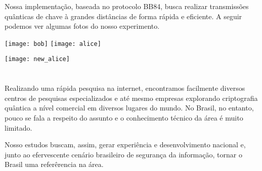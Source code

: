 \documentclass{sciposter}
\newcommand{\tituloA}[1]{\emph{\textbf{\color{white}{#1}}}}
\begin{document}
\begin{multicols*}{2}
{\vspace{0.5cm}
\par Nossa implementação, baseada no protocolo BB84, busca realizar transmissões quânticas de chave à grandes distâncias de forma rápida e eficiente. A seguir podemos ver algumas fotos do nosso experimento.

\vspace{1cm}
\hspace{1cm}
\texttt{[image: bob]}
\hspace{0.5cm}
\texttt{[image: alice]}

\vspace{1cm}
\hspace{8.75cm}
\texttt{[image: new\_alice]}



\section*{\tituloA{\color{white}{\large{Ao Infinito e Além!}}}}

\par Realizando uma rápida pesquisa na internet, encontramos facilmente diversos centros de pesquisas especializados e até mesmo empresas explorando criptografia quântica a nível comercial em diversos lugares do mundo. No Brasil, no entanto, pouco se fala a respeito do assunto e o conhecimento técnico da área é muito limitado.
\par Nosso estudos buscam, assim, gerar experiência e desenvolvimento nacional e, junto ao efervescente cenário brasileiro de segurança da informação, tornar o Brasil uma referêrencia na área.


}
\end{multicols*}
\end{document}
